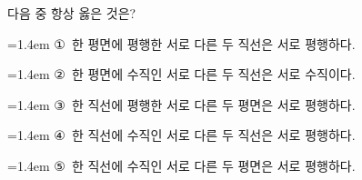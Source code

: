 다음 중 항상 옳은 것은?
\par\medskip\par\noindent\hangindent=1.4em {\small ①}\ 한 평면에 평행한 서로 다른 두 직선은 서로 평행하다.\par\noindent\hangindent=1.4em {\small ②}\ 한 평면에 수직인 서로 다른 두 직선은 서로 수직이다.\par\noindent\hangindent=1.4em {\small ③}\ 한 직선에 평행한 서로 다른 두 평면은 서로 평행하다.\par\noindent\hangindent=1.4em {\small ④}\ 한 직선에 수직인 서로 다른 두 직선은 서로 평행하다.\par\noindent\hangindent=1.4em {\small ⑤}\ 한 직선에 수직인 서로 다른 두 평면은 서로 평행하다.\par\medskip
